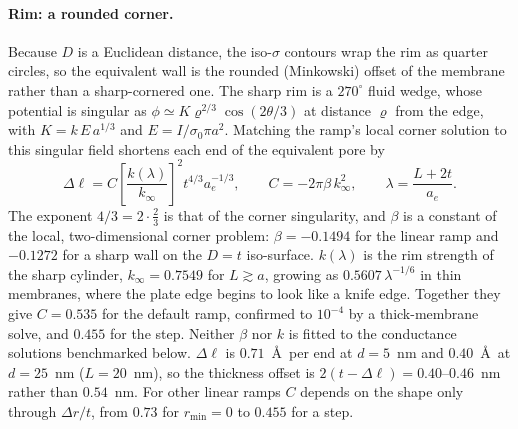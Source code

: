 \paragraph{Rim: a rounded corner.}
Because $D$ is a Euclidean distance, the iso-$\sigma$ contours wrap the rim as quarter circles, so the equivalent wall is the rounded (Minkowski) offset of the membrane rather than a sharp-cornered one. The sharp rim is a $270^{\circ}$ fluid wedge, whose potential is singular as $\phi \simeq K\varrho^{2/3}\cos(2\theta/3)$ at distance $\varrho$ from the edge, with $K = k\,E\,a^{1/3}$ and $E = I/\sigma_0\pi a^{2}$. Matching the ramp's local corner solution to this singular field shortens each end of the equivalent pore by
\begin{equation}
\Delta\ell = C\left[\frac{k(\lambda)}{k_\infty}\right]^{2} t^{4/3}a_e^{-1/3},\qquad C = -2\pi\beta\,k_\infty^{2},\qquad \lambda = \frac{L + 2t}{a_e}.
\label{eq:rim}
\end{equation}
The exponent $4/3 = 2\cdot\tfrac{2}{3}$ is that of the corner singularity, and $\beta$ is a constant of the local, two-dimensional corner problem: $\beta = -0.1494$ for the linear ramp and $-0.1272$ for a sharp wall on the $D = t$ iso-surface. $k(\lambda)$ is the rim strength of the sharp cylinder, $k_\infty = 0.7549$ for $L \gtrsim a$, growing as $0.5607\,\lambda^{-1/6}$ in thin membranes, where the plate edge begins to look like a knife edge. Together they give $C = 0.535$ for the default ramp, confirmed to $10^{-4}$ by a thick-membrane solve, and $0.455$ for the step. Neither $\beta$ nor $k$ is fitted to the conductance solutions benchmarked below. $\Delta\ell$ is $0.71$~\AA\ per end at $d = 5$~nm and $0.40$~\AA\ at $d = 25$~nm ($L = 20$~nm), so the thickness offset is $2(t - \Delta\ell) = 0.40$--$0.46$~nm rather than $0.54$~nm. For other linear ramps $C$ depends on the shape only through $\Delta r/t$, from $0.73$ for $r_\mathrm{min} = 0$ to $0.455$ for a step.

